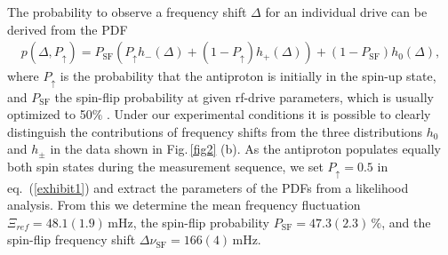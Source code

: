 \documentclass[preprint%
]{elsarticle}
\begin{document}
The probability to observe a frequency shift $\Delta$ for an individual drive can be derived from the PDF
\begin{eqnarray}
p(\Delta,P_{\uparrow}) = P_\mathrm{SF} \left(P_{\uparrow} h_-(\Delta) + (1 - P_{\uparrow}) h_+(\Delta)\right)+ %
(1-P_\mathrm{SF}) h_0(\Delta),
\label{exhibit1}
\end{eqnarray}
where $P_{\uparrow}$ is the probability that the antiproton is initially in the spin-up state, and $P_\mathrm{SF}$ the spin-flip probability at given rf-drive parameters, which is usually optimized to 50$\%$ \cite{BrownGeoniumLineshape}. Under our experimental conditions it is possible to clearly distinguish the contributions of frequency shifts from the three distributions $h_0$ and $h_\pm$ in the data shown in Fig.$\,$\ref{fig2} (b). As the antiproton populates equally both spin states during the measurement sequence, we set $P_{\uparrow}=0.5$ in eq.~(\ref{exhibit1}) and extract the parameters of the PDFs from a likelihood analysis. From this we determine the mean frequency fluctuation $\Xi_{ref}=48.1(1.9)\,$mHz, the spin-flip probability $P_\mathrm{SF}=47.3(2.3)\,\%$, and the spin-flip frequency shift $\Delta\nu_{\mathrm{SF}}=166(4)\,$mHz. 
\end{document}
